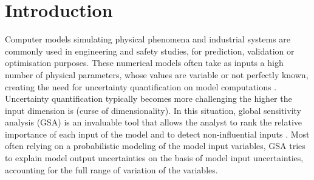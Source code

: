 \documentclass[a4paper,11pt]{article}
\newcommand{\ve}[1]{\boldsymbol{#1}}
\renewcommand{\citep}[2][]{\cite[#1]{#2}}
\theoremstyle{definition}
\theoremstyle{remark}
\theoremstyle{theorem}
\begin{document}
%
%

\section{Introduction}

Computer models simulating physical phenomena and industrial systems are commonly used in engineering and safety studies, for prediction, validation or optimisation purposes.
These numerical models often take as inputs a high number of physical parameters, whose values are variable or not perfectly known, creating the need for uncertainty quantification on model computations \citep{smi14}. 
Uncertainty quantification typically becomes more challenging the higher the input dimension is (curse of dimensionality).
In this situation, global sensitivity analysis (GSA) 
is an invaluable tool that allows the analyst to rank the relative importance of each input of the model and to detect non-influential inputs \citep{borpli16,razjak21}.
Most often relying on a probabilistic modeling of the model input variables, GSA tries to explain model output uncertainties on the basis of model input uncertainties, accounting for the full range of variation of the variables.
\end{document}
